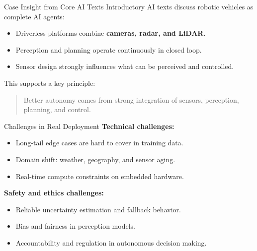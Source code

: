 \documentclass[10pt]{beamer}
\begin{document}
\begin{frame}{Case Insight from Core AI Texts}
    Introductory AI texts discuss robotic vehicles as complete AI agents:
    \begin{itemize}
        \item Driverless platforms combine \textbf{cameras, radar, and LiDAR}.
        \item Perception and planning operate continuously in closed loop.
        \item Sensor design strongly influences what can be perceived and controlled.
    \end{itemize}

    \vspace{0.2cm}
    This supports a key principle:
    \begin{quote}
        \small Better autonomy comes from strong integration of sensors, perception, planning, and control.
    \end{quote}
\end{frame}

\begin{frame}{Challenges in Real Deployment}
    \textbf{Technical challenges:}
    \begin{itemize}
        \item Long-tail edge cases are hard to cover in training data.
        \item Domain shift: weather, geography, and sensor aging.
        \item Real-time compute constraints on embedded hardware.
    \end{itemize}

    \vspace{0.2cm}
    \textbf{Safety and ethics challenges:}
    \begin{itemize}
        \item Reliable uncertainty estimation and fallback behavior.
        \item Bias and fairness in perception models.
        \item Accountability and regulation in autonomous decision making.
    \end{itemize}
\end{frame}
\end{document}

